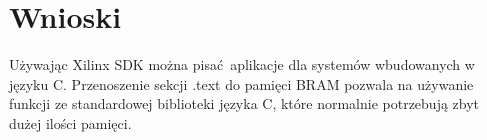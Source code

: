 \section{Wnioski}

Używając Xilinx SDK można pisać aplikacje dla systemów wbudowanych w języku C. Przenoszenie sekcji
.text do pamięci BRAM pozwala na używanie funkcji ze standardowej biblioteki języka C, które
normalnie potrzebują zbyt dużej ilości pamięci.

\endinput
